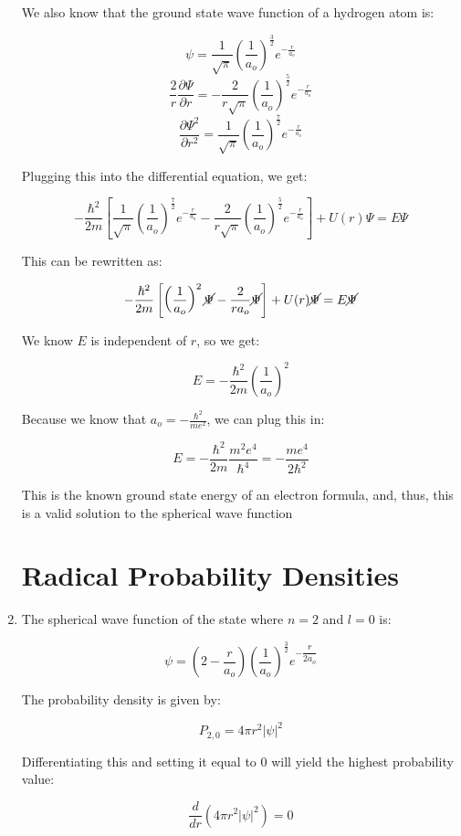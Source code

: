 \begin{enumerate}
    We also know that the ground state wave function of a hydrogen atom is:

    $$\psi=\frac{1}{\sqrt{\pi}}\left( \frac{1}{a_o} \right)^{\frac{3}{2}}e^{-\frac{r}{a_o}}$$
    $$\frac{2}{r}\frac{\partial \Psi}{\partial r}=-\frac{2}{r\sqrt{\pi}}\left( \frac{1}{a_o} \right)^{\frac{5}{2}}e^{-\frac{r}{a_o}}$$
    $$\frac{\partial\Psi^2}{\partial r^2}=\frac{1}{\sqrt{\pi}}\left( \frac{1}{a_o} \right)^{\frac{7}{2}}e^{-\frac{r}{a_o}}$$

    Plugging this into the differential equation, we get:

    $$-\frac{\hbar^2}{2m}\left[ \frac{1}{\sqrt{\pi}}\left( \frac{1}{a_o} \right)^{\frac{7}{2}}e^{-\frac{r}{a_o}}-\frac{2}{r\sqrt{\pi}}\left( \frac{1}{a_o} \right)^{\frac{5}{2}}e^{-\frac{r}{a_o}} \right]+U(r)\Psi=E\Psi$$

    This can be rewritten as:

    $$-\frac{\hbar^2}{2m}\left[ \left( \frac{1}{a_o} \right)^2\cancel{\Psi}-\frac{2}{ra_o}\cancel{\Psi} \right]+U(r)\cancel{\Psi}=E\cancel{\Psi}$$

    We know $E$ is independent of $r$, so we get:

    $$E=-\frac{\hbar^2}{2m}\left( \frac{1}{a_o} \right)^2$$

    Because we know that $a_o=-\frac{\hbar^2}{me^2}$, we can plug this in:

    $$E=-\frac{\hbar^2}{2m}\frac{m^2e^4}{\hbar^4}=-\frac{me^4}{2\hbar^2}$$

    This is the known ground state energy of an electron formula, and, thus, this is a valid solution to the spherical wave function

    \section*{Radical Probability Densities}

  \item The spherical wave function of the state where $n=2$ and $l=0$ is:

    $$\psi=\left( 2-\frac{r}{a_o} \right)\left( \frac{1}{a_o} \right)^{\frac{3}{2}}e^{-\dfrac{r}{2a_o}}$$

    The probability density is given by:

  $$P_{2,0}=4\pi r^2|\psi|^2$$

  Differentiating this and setting it equal to 0 will yield the highest probability value:

  $$\dfrac{d}{dr}\left( 4\pi r^2|\psi|^2 \right)=0$$


\end{enumerate}
